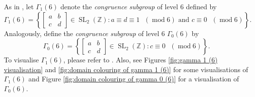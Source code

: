 \documentclass[12pt, a4paper]{amsart}
\theoremstyle{definition}
\numberwithin{theorem}{section}
\begin{document}
As in \cite{DiamondShurman2005}, let $\Gamma_1\left(6\right)$ denote the \emph{congruence subgroup} of level 6 defined by \[\Gamma_1\left(6\right)=\left\{\begin{bmatrix}
    a&b\\c&d
\end{bmatrix}\in\operatorname{SL}_2\left(\mathbb{Z}\right):a\equiv d\equiv 1\text{ }\left(\operatorname{mod}6\right)\text{ and }c\equiv 0 \text{ }\left(\operatorname{mod}6\right)\right\}.\]
Analogously, define the \emph{congruence subgroup} of level 6 $\Gamma_0\left(6\right)$ by 
\[\Gamma_0\left(6\right)=\left\{\begin{bmatrix}
    a&b\\c&d
\end{bmatrix}\in\operatorname{SL}_2\left(\mathbb{Z}\right):c\equiv 0 \text{ }\left(\operatorname{mod}6\right)\right\}.\]
To visualise $\Gamma_1\left(6\right)$, please refer to \cite{LowryDuda2021}. Also, see Figures \ref{fig:gamma 1 (6) visualisation} and \ref{fig:domain colouring of gamma 1 (6)} for some visualisations of $\Gamma_1\left(6\right)$ and Figure \ref{fig:domain colouring of gamma 0 (6)} for a visualisation of $\Gamma_0\left(6\right)$.
\end{document}
